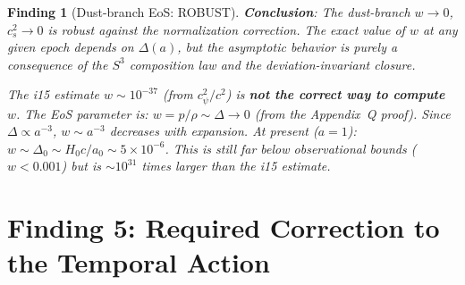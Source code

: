 \documentclass[11pt]{article}
\newtheorem{finding}{Finding}
\newcommand{\ee}[1]{\times 10^{#1}}
\begin{document}
\begin{finding}[Dust-branch EoS: ROBUST]
\textbf{Conclusion}: The dust-branch $w \to 0$, $c_s^2 \to 0$ is
robust against the normalization correction. The exact value of $w$
at any given epoch depends on $\Delta(a)$, but the asymptotic behavior
is purely a consequence of the $S^3$ composition law and the deviation-invariant
closure.

The i15 estimate $w \sim 10^{-37}$ (from $c_\psi^2/c^2$) is
\textbf{not the correct way to compute $w$}. The EoS parameter is:
$w = p/\rho \sim \Delta \to 0$ (from the Appendix~Q proof). Since
$\Delta \propto a^{-3}$, $w \sim a^{-3}$ decreases with expansion.
At present ($a = 1$): $w \sim \Delta_0 \sim H_0 c/a_0 \sim 5\ee{-6}$.
This is still far below observational bounds ($w < 0.001$) but
is $\sim 10^{31}$ times larger than the i15 estimate.
\end{finding}


\part{Finding 5: Required Correction to the Temporal Action}
\label{part:correction}
\end{document}
